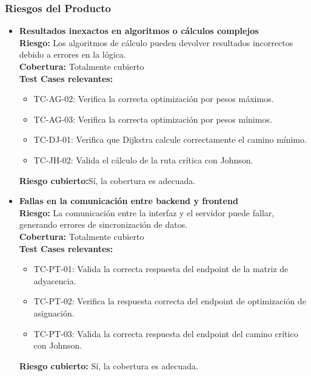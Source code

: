 \documentclass[stu, 12pt, letterpaper, donotrepeattitle, floatsintext, natbib]{apa7}
\begin{document}
\subsubsection{Riesgos del Producto}

\begin{itemize}
    \item \textbf{Resultados inexactos en algoritmos o cálculos complejos} \\ 
    \textbf{Riesgo:} Los algoritmos de cálculo pueden devolver resultados incorrectos debido a errores en la lógica. \\ 
    \textbf{Cobertura:} Totalmente cubierto \\ 
    \textbf{Test Cases relevantes:} 
    \begin{itemize}
      \item TC-AG-02: Verifica la correcta optimización por pesos máximos.
      \item TC-AG-03: Verifica la correcta optimización por pesos mínimos.
      \item TC-DJ-01: Verifica que Dijkstra calcule correctamente el camino mínimo.
      \item TC-JH-02: Valida el cálculo de la ruta crítica con Johnson.
    \end{itemize}
    \textbf{Riesgo cubierto:}Sí, la cobertura es adecuada.
  
    \item \textbf{Fallas en la comunicación entre backend y frontend} \\ 
    \textbf{Riesgo:} La comunicación entre la interfaz y el servidor puede fallar, generando errores de sincronización de datos. \\ 
    \textbf{Cobertura:} Totalmente cubierto \\ 
    \textbf{Test Cases relevantes:} 
    \begin{itemize}
      \item TC-PT-01: Valida la correcta respuesta del endpoint de la matriz de adyacencia.
      \item TC-PT-02: Verifica la respuesta correcta del endpoint de optimización de asignación.
      \item TC-PT-03: Valida la correcta respuesta del endpoint del camino crítico con Johnson.
    \end{itemize}
    \textbf{Riesgo cubierto:} Sí, la cobertura es adecuada.
  

\end{itemize}
\end{document}
